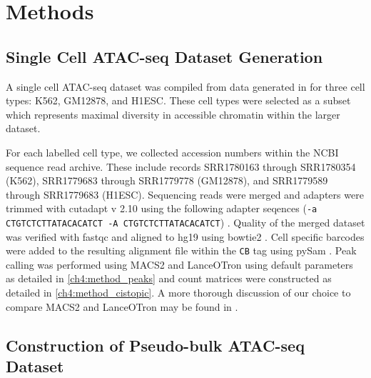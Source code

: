 

\section{Methods} \label{ch4:methods}


\subsection{Single Cell ATAC-seq Dataset Generation} \label{methods:sc_ds}

A single cell ATAC-seq dataset was compiled from data generated in \textcite{Buenrostro2015} for three cell types: K562, GM12878, and H1ESC. These cell types were selected as a subset which represents maximal diversity in accessible chromatin within the larger dataset. 

For each labelled cell type, we collected accession numbers within the NCBI sequence read archive. These include records SRR1780163 through SRR1780354 (K562), SRR1779683 through SRR1779778 (GM12878), and SRR1779589 through SRR1779683 (H1ESC). Sequencing reads were merged and adapters were trimmed with cutadapt v 2.10 using the following adapter seqences ({\tt -a CTGTCTCTTATACACATCT -A CTGTCTCTTATACACATCT}) \cite{Martin2011}. Quality of the merged dataset was verified with fastqc and aligned to hg19 using bowtie2 \cite{Andrews2010, Langmead2013}. Cell specific barcodes were added to the resulting alignment file within the {\tt CB} tag using pySam \cite{Heger2009}. Peak calling was performed using MACS2 and LanceOTron using default parameters \cite{Gaspar2018, Hentges2021} as detailed in \autoref{ch4:method_peaks} and count matrices were constructed as detailed in \autoref{ch4:method_cistopic}. A more thorough discussion of our choice to compare MACS2 and LanceOTron may be found in .

\subsection{Construction of Pseudo-bulk ATAC-seq Dataset}

